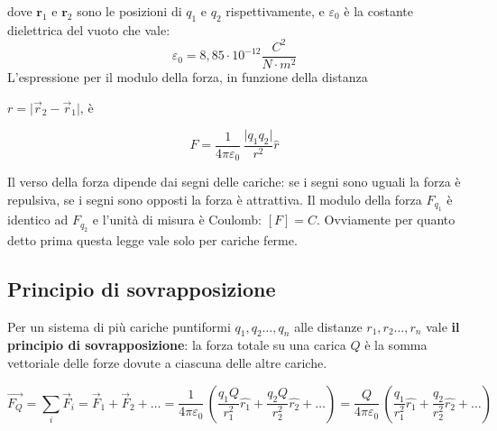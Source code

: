 \documentclass{book}
\begin{document}
dove \(\mathbf r_1\) e \(\mathbf r_2\) sono le posizioni di \(q_1\) e \(q_2\) rispettivamente, e \(\varepsilon_0\) è la costante dielettrica del vuoto che vale: 
$$
\varepsilon_0= 8,85 \cdot 10^{-12} \frac{C^2}{N\cdot m^2}
$$
L'espressione per il modulo della forza, in funzione della distanza 

\(r=\lvert \vec{r}_2-\vec{r}_1\rvert\), è


\begin{figure}[ht]
  \centering
  \begin{minipage}[c]{0.7\textwidth} 
    \[
      F = \frac{1}{4\pi\varepsilon_0}\,\frac{\lvert q_1 q_2\rvert}{r^{2}}\hat{r}
    \]
  \end{minipage}\hfill
  \begin{minipage}[c]{0.28\textwidth}
  \end{minipage}
\end{figure}


Il verso della forza dipende dai segni delle cariche: se i segni sono uguali la forza è repulsiva, se i segni sono opposti la forza è attrattiva.
Il modulo della forza $F_{q_{1}}$ è identico ad $F_{q_{2}}$ e l'unità di misura è Coulomb: $[F]= C$. Ovviamente per quanto detto prima questa legge vale solo per cariche ferme.


\subsection{Principio di sovrapposizione}
 Per un sistema di più cariche puntiformi $q_1, q_2 \dots, q_n $ alle distanze $r_1, r_2 \dots, r_n $  vale \textbf{il principio di sovrapposizione}: la forza totale su una carica $Q$ è la somma vettoriale delle forze dovute a ciascuna delle altre cariche.


\[
\vec{F_Q}=\sum_i \vec{F}_i = \vec{F}_1+\vec{F}_2+ \dots =  \frac{1}{4\pi\varepsilon_0}\,  ( \frac{ q_1 Q}{r_{1}^{2}} \hat{r_1} + \frac{ q_2 Q}{r_{2}^{2}}\hat{r_2}+\dots)
= \frac{Q}{4\pi\varepsilon_0}\, ( \frac{ q_1 }{r_{1}^{2}}\hat{r_1}+ \frac{ q_2 }{r_{2}^{2}}\hat{r_2}+\dots) 
\]   
\end{document}
